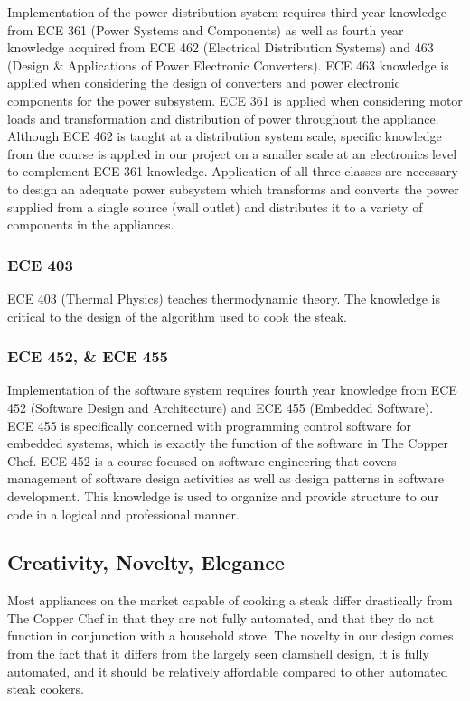\documentclass[11pt]{article}
\begin{document}
Implementation of the power distribution system requires third year knowledge from ECE 361 (Power Systems and Components) as well as fourth year knowledge acquired from ECE 462 (Electrical Distribution Systems) and 463 (Design \& Applications of Power Electronic Converters).
ECE 463 knowledge is applied when considering the design of converters and power electronic components for the power subsystem.
 ECE 361 is applied when considering motor loads and transformation and distribution of power throughout the appliance.
Although ECE 462 is taught at a distribution system scale, specific knowledge from the course is applied in our project on a smaller scale at an electronics level to complement ECE 361 knowledge.
Application of all three classes are necessary to design an adequate power subsystem which transforms and converts the power supplied from a single source (wall outlet) and distributes it to a variety of components in the appliances.

\subsubsection{ECE 403}

ECE 403 (Thermal Physics) teaches thermodynamic theory.
The knowledge is critical to the design of the algorithm used to cook the steak.

\subsubsection{ECE 452, \& ECE 455}

Implementation of the software system requires fourth year knowledge from ECE 452 (Software Design and Architecture) and ECE 455 (Embedded Software).
ECE 455 is specifically concerned with programming control software for embedded systems, which is exactly the function of the software in The Copper Chef.
ECE 452 is a course focused on software engineering that covers management of software design activities as well as design patterns in software development.
This knowledge is used to organize and provide structure to our code in a logical and professional manner.

\subsection{Creativity, Novelty, Elegance}

Most appliances on the market capable of cooking a steak differ drastically from The Copper Chef in that they are not fully automated, and that they do not function in conjunction with a household stove.
The novelty in our design comes from the fact that it differs from the largely seen clamshell design, it is fully automated, and it should be relatively affordable compared to other automated steak cookers.
\end{document}
